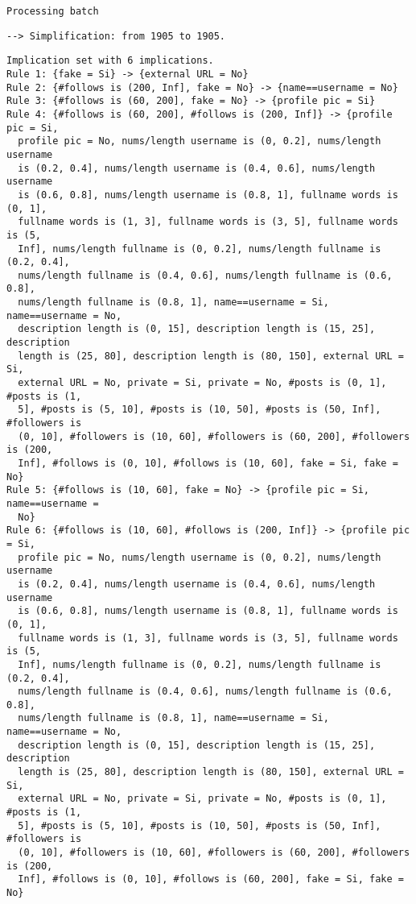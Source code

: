\documentclass[
  letterpaper,
  DIV=11,
  numbers=noendperiod]{scrreprt}
\newenvironment{Shaded}{\begin{snugshade}}{\end{snugshade}}
\newcommand{\FunctionTok}[1]{\textcolor[rgb]{0.28,0.35,0.67}{#1}}
\newcommand{\NormalTok}[1]{\textcolor[rgb]{0.00,0.23,0.31}{#1}}
\newcommand{\SpecialCharTok}[1]{\textcolor[rgb]{0.37,0.37,0.37}{#1}}
\begin{document}
\begin{verbatim}
Processing batch
\end{verbatim}

\begin{verbatim}
--> Simplification: from 1905 to 1905.
\end{verbatim}

\begin{Shaded}
\end{Shaded}

\begin{verbatim}
Implication set with 6 implications.
Rule 1: {fake = Si} -> {external URL = No}
Rule 2: {#follows is (200, Inf], fake = No} -> {name==username = No}
Rule 3: {#follows is (60, 200], fake = No} -> {profile pic = Si}
Rule 4: {#follows is (60, 200], #follows is (200, Inf]} -> {profile pic = Si,
  profile pic = No, nums/length username is (0, 0.2], nums/length username
  is (0.2, 0.4], nums/length username is (0.4, 0.6], nums/length username
  is (0.6, 0.8], nums/length username is (0.8, 1], fullname words is (0, 1],
  fullname words is (1, 3], fullname words is (3, 5], fullname words is (5,
  Inf], nums/length fullname is (0, 0.2], nums/length fullname is (0.2, 0.4],
  nums/length fullname is (0.4, 0.6], nums/length fullname is (0.6, 0.8],
  nums/length fullname is (0.8, 1], name==username = Si, name==username = No,
  description length is (0, 15], description length is (15, 25], description
  length is (25, 80], description length is (80, 150], external URL = Si,
  external URL = No, private = Si, private = No, #posts is (0, 1], #posts is (1,
  5], #posts is (5, 10], #posts is (10, 50], #posts is (50, Inf], #followers is
  (0, 10], #followers is (10, 60], #followers is (60, 200], #followers is (200,
  Inf], #follows is (0, 10], #follows is (10, 60], fake = Si, fake = No}
Rule 5: {#follows is (10, 60], fake = No} -> {profile pic = Si, name==username =
  No}
Rule 6: {#follows is (10, 60], #follows is (200, Inf]} -> {profile pic = Si,
  profile pic = No, nums/length username is (0, 0.2], nums/length username
  is (0.2, 0.4], nums/length username is (0.4, 0.6], nums/length username
  is (0.6, 0.8], nums/length username is (0.8, 1], fullname words is (0, 1],
  fullname words is (1, 3], fullname words is (3, 5], fullname words is (5,
  Inf], nums/length fullname is (0, 0.2], nums/length fullname is (0.2, 0.4],
  nums/length fullname is (0.4, 0.6], nums/length fullname is (0.6, 0.8],
  nums/length fullname is (0.8, 1], name==username = Si, name==username = No,
  description length is (0, 15], description length is (15, 25], description
  length is (25, 80], description length is (80, 150], external URL = Si,
  external URL = No, private = Si, private = No, #posts is (0, 1], #posts is (1,
  5], #posts is (5, 10], #posts is (10, 50], #posts is (50, Inf], #followers is
  (0, 10], #followers is (10, 60], #followers is (60, 200], #followers is (200,
  Inf], #follows is (0, 10], #follows is (60, 200], fake = Si, fake = No}
\end{verbatim}
\end{document}
